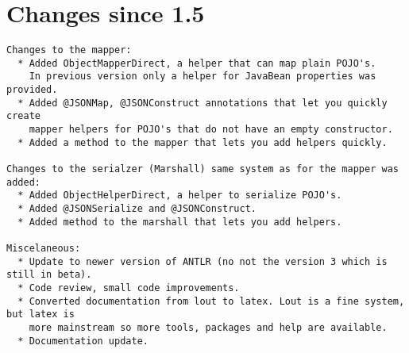 \documentclass[a4paper]{article}
\begin{document}
\newpage
\section{Changes since 1.5}
\begin{verbatim}
Changes to the mapper:
  * Added ObjectMapperDirect, a helper that can map plain POJO's. 
    In previous version only a helper for JavaBean properties was provided.
  * Added @JSONMap, @JSONConstruct annotations that let you quickly create 
    mapper helpers for POJO's that do not have an empty constructor.
  * Added a method to the mapper that lets you add helpers quickly.

Changes to the serialzer (Marshall) same system as for the mapper was added:
  * Added ObjectHelperDirect, a helper to serialize POJO's. 
  * Added @JSONSerialize and @JSONConstruct.
  * Added method to the marshall that lets you add helpers.

Miscelaneous:
  * Update to newer version of ANTLR (no not the version 3 which is still in beta).
  * Code review, small code improvements.
  * Converted documentation from lout to latex. Lout is a fine system, but latex is
    more mainstream so more tools, packages and help are available.
  * Documentation update.
\end{verbatim}
 
\end{document}

